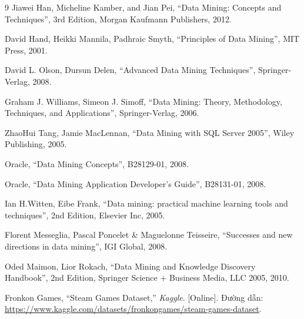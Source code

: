 \newpage

\begin{thebibliography}{9}
    Jiawei Han, Micheline Kamber, and Jian Pei, ``Data Mining: Concepts and Techniques'', 3rd Edition, Morgan Kaufmann Publishers, 2012.

    David Hand, Heikki Mannila, Padhraic Smyth, ``Principles of Data Mining'', MIT Press, 2001.

    David L. Olson, Dursun Delen, ``Advanced Data Mining Techniques'', Springer-Verlag, 2008.

    Graham J. Williams, Simeon J. Simoff, ``Data Mining: Theory, Methodology, Techniques, and Applications'', Springer-Verlag, 2006.

    ZhaoHui Tang, Jamie MacLennan, ``Data Mining with SQL Server 2005'', Wiley Publishing, 2005.

    Oracle, ``Data Mining Concepts'', B28129-01, 2008.

    Oracle, ``Data Mining Application Developer’s Guide'', B28131-01, 2008. 

    Ian H.Witten, Eibe Frank, ``Data mining: practical machine learning tools and techniques'', 2nd Edition, Elsevier Inc, 2005. 

    Florent Messeglia, Pascal Poncelet \& Maguelonne Teisseire, ``Successes and new directions in data mining'', IGI Global, 2008.

    Oded Maimon, Lior Rokach, ``Data Mining and Knowledge Discovery Handbook'', 2nd Edition, Springer Science + Business Media, LLC 2005, 2010.

    Fronkon Games, ``Steam Games Dataset,'' \textit{Kaggle}. [Online]. Đường dẫn: \url{https://www.kaggle.com/datasets/fronkongames/steam-games-dataset}.

\end{thebibliography}

